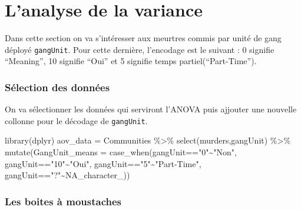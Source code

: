 \documentclass[
]{book}
\newenvironment{Shaded}{\begin{snugshade}}{\end{snugshade}}
\newcommand{\AttributeTok}[1]{\textcolor[rgb]{0.77,0.63,0.00}{#1}}
\newcommand{\ConstantTok}[1]{\textcolor[rgb]{0.00,0.00,0.00}{#1}}
\newcommand{\FunctionTok}[1]{\textcolor[rgb]{0.00,0.00,0.00}{#1}}
\newcommand{\NormalTok}[1]{#1}
\newcommand{\OtherTok}[1]{\textcolor[rgb]{0.56,0.35,0.01}{#1}}
\newcommand{\SpecialCharTok}[1]{\textcolor[rgb]{0.00,0.00,0.00}{#1}}
\newcommand{\StringTok}[1]{\textcolor[rgb]{0.31,0.60,0.02}{#1}}
\begin{document}
\hypertarget{lanalyse-de-la-variance}{%
\chapter{L'analyse de la variance}\label{lanalyse-de-la-variance}}

Dans cette section on va s'intéresser aux meurtres commis par unité de gang déployé \texttt{gangUnit}. Pour cette dernière, l'encodage est le suivant : 0 signifie ``Meaning'', 10 signifie ``Oui'' et 5 signifie temps partiel(``Part-Time'').\\

\hypertarget{suxe9lection-des-donnuxe9es}{%
\subsection*{Sélection des données}\label{suxe9lection-des-donnuxe9es}}

On va sélectionner les données qui serviront l'ANOVA puis ajjouter une nouvelle collonne pour le décodage de \texttt{gangUnit}.

\begin{Shaded}
\begin{Highlighting}[]
\FunctionTok{library}\NormalTok{(dplyr)}
\NormalTok{aov\_data }\OtherTok{=}\NormalTok{ Communities }\SpecialCharTok{\%\textgreater{}\%} \FunctionTok{select}\NormalTok{(murders,gangUnit) }\SpecialCharTok{\%\textgreater{}\%} 
          \FunctionTok{mutate}\NormalTok{(}\AttributeTok{GangUnit\_means =} \FunctionTok{case\_when}\NormalTok{(gangUnit}\SpecialCharTok{==}\StringTok{"0"}\SpecialCharTok{\textasciitilde{}}\StringTok{"Non"}\NormalTok{,}
\NormalTok{                                     gangUnit}\SpecialCharTok{==}\StringTok{"10"}\SpecialCharTok{\textasciitilde{}}\StringTok{"Oui"}\NormalTok{,}
\NormalTok{                                     gangUnit}\SpecialCharTok{==}\StringTok{"5"}\SpecialCharTok{\textasciitilde{}}\StringTok{"Part{-}Time"}\NormalTok{,}
\NormalTok{                                     gangUnit}\SpecialCharTok{==}\StringTok{"?"}\SpecialCharTok{\textasciitilde{}}\ConstantTok{NA\_character\_}\NormalTok{))}
\end{Highlighting}
\end{Shaded}

\hypertarget{les-boites-uxe0-moustaches}{%
\subsection*{Les boites à moustaches}\label{les-boites-uxe0-moustaches}}
\end{document}
